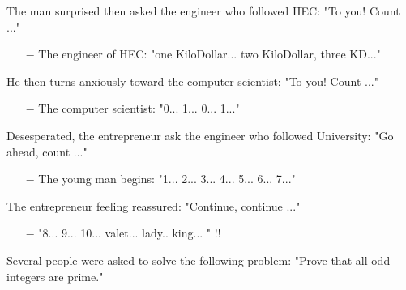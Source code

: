 The man surprised then asked the engineer who followed HEC: "To you! Count ..."

\begin{itemize}	 
	\item[$-$] The engineer of HEC: "one KiloDollar... two KiloDollar, three KD..."\end{itemize} 


He then turns anxiously toward the computer scientist: "To you! Count ..."

\begin{itemize}	 
	\item[$-$] The computer scientist: "0... 1... 0... 1..." \end{itemize}

Desesperated, the entrepreneur ask the engineer who followed University: "Go ahead, count ..."

\begin{itemize}	 
	\item[$-$] The young man begins: "1... 2... 3... 4... 5... 6... 7..." \end{itemize}

The entrepreneur feeling reassured: "Continue, continue ..."

\begin{itemize}	 
	\item[$-$] "8... 9... 10... valet... lady.. king... " !!\end{itemize}
	
	\begin{center}\underline{\hspace{5 cm}}\end{center}

Several people were asked to solve the following problem: "Prove that all odd integers are prime."

